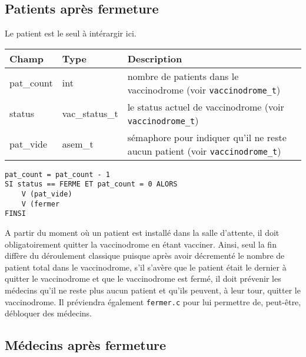 \documentclass[a4paper]{article}
\begin{document}
\subsection{Patients après fermeture}

Le patient est le seul à intérargir ici.
\bigskip \newline
\begin{tabularx}{\linewidth}{|l|l|>{\strut}X|}
  \hline%
  Champ & Type & Description \\ \hline%
  pat\_count & int & nombre de patients dans le vaccinodrome (voir \texttt{vaccinodrome\_t}) \\ \hline%
  status & vac\_status\_t & le status actuel de vaccinodrome (voir \texttt{vaccinodrome\_t}) \\ \hline%
  pat\_vide & asem\_t & sémaphore pour indiquer qu’il ne reste aucun patient (voir \texttt{vaccinodrome\_t}) \\ \hline%
\end{tabularx}

\begin{verbatim}
pat_count = pat_count - 1
SI status == FERME ET pat_count = 0 ALORS
    V (pat_vide)
    V (fermer
FINSI
\end{verbatim}

\medskip \par
A partir du moment où un patient est installé dans la salle d'attente, il doit obligatoirement quitter la vaccinodrome en étant vacciner. Ainsi, seul la fin diffère du déroulement classique puisque après avoir décrementé le nombre de patient total dans le vaccinodrome, s'il s'avère que le patient était le dernier à quitter le vaccinodrome et que le vaccinodrome est fermé, il doit prévenir les médecins qu'il ne reste plus aucun patient et qu'ils peuvent, à leur tour, quitter le vaccinodrome. Il préviendra également \texttt{fermer.c} pour lui permettre de, peut-être, débloquer des médecins.

\subsection{Médecins après fermeture}
\end{document}
